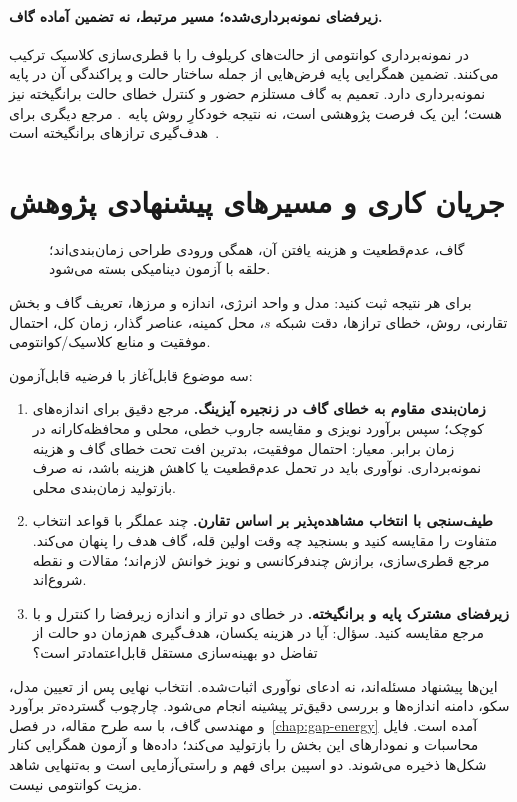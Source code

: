 \paragraph{زیرفضای نمونه‌برداری‌شده؛ مسیر مرتبط، نه تضمین آماده گاف.}
 در  نمونه‌برداری کوانتومی از حالت‌های کریلوف را با قطری‌سازی کلاسیک ترکیب می‌کنند.
تضمین همگرایی پایه فرض‌هایی از جمله ساختار حالت و پراکندگی آن در پایه نمونه‌برداری دارد.
تعمیم به گاف مستلزم حضور و کنترل خطای حالت برانگیخته نیز هست؛ این یک فرصت پژوهشی است، نه نتیجه خودکارِ روش پایه~\cite{GapYu2025}.
 مرجع دیگری برای هدف‌گیری ترازهای برانگیخته است~\cite{GapHiggott2019}.

\section{جریان کاری و مسیرهای پیشنهادی پژوهش}
\label{sec:gap-projects}
\begin{figure}[htbp]
	\centering
	\caption{گاف، عدم‌قطعیت و هزینه یافتن آن، همگی ورودی طراحی زمان‌بندی‌اند؛ حلقه با آزمون دینامیکی بسته می‌شود.}
	\label{fig:gap-workflow}
\end{figure}
برای هر نتیجه ثبت کنید: مدل و واحد انرژی، اندازه و مرزها، تعریف گاف و بخش تقارنی، روش، خطای ترازها، دقت شبکه $s$، محل کمینه، عناصر گذار، زمان کل، احتمال موفقیت و منابع کلاسیک/کوانتومی.

سه موضوع قابل‌آغاز با فرضیه قابل‌آزمون:
\begin{enumerate}
	\item \textbf{زمان‌بندی مقاوم به خطای گاف در زنجیره آیزینگ.}
	مرجع دقیق برای اندازه‌های کوچک؛ سپس برآورد نویزی و مقایسه جاروب خطی، محلی و محافظه‌کارانه در زمان برابر.
	معیار: احتمال موفقیت، بدترین افت تحت خطای گاف و هزینه نمونه‌برداری.
	نوآوری باید در تحمل عدم‌قطعیت یا کاهش هزینه باشد، نه صرف بازتولید زمان‌بندی محلی.
	\item \textbf{طیف‌سنجی با انتخاب مشاهده‌پذیر بر اساس تقارن.}
	چند عملگر با قواعد انتخاب متفاوت را مقایسه کنید و بسنجید چه وقت اولین قله، گاف هدف را پنهان می‌کند.
	مرجع قطری‌سازی، برازش چندفرکانسی و نویز خوانش لازم‌اند؛ مقالات  و  نقطه شروع‌اند.
	\item \textbf{زیرفضای مشترک پایه و برانگیخته.}
	در  خطای دو تراز و اندازه زیرفضا را کنترل و با مرجع مقایسه کنید.
	سؤال: آیا در هزینه یکسان، هدف‌گیری هم‌زمان دو حالت از تفاضل دو بهینه‌سازی مستقل قابل‌اعتمادتر است؟
\end{enumerate}
این‌ها پیشنهاد مسئله‌اند، نه ادعای نوآوری اثبات‌شده. انتخاب نهایی پس از تعیین مدل، سکو، دامنه اندازه‌ها و بررسی دقیق‌تر پیشینه انجام می‌شود. چارچوب گسترده‌تر برآورد و مهندسی گاف، با سه طرح مقاله، در فصل~\ref{chap:gap-energy} آمده است.
فایل  محاسبات و نمودارهای این بخش را بازتولید می‌کند؛ داده‌ها و آزمون همگرایی کنار شکل‌ها ذخیره می‌شوند.
دو اسپین برای فهم و راستی‌آزمایی است و به‌تنهایی شاهد مزیت کوانتومی نیست.
\endgroup



